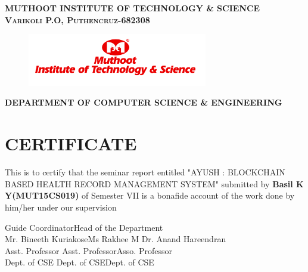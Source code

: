 \documentclass[12pt]{report}
\begin{document}
\newpage\begin{titlepage}
\center


\textsc{ \textbf{MUTHOOT INSTITUTE OF TECHNOLOGY \& SCIENCE}}\\
\textsc{\textbf{Varikoli P.O, Puthencruz-682308}}
\vspace{0.7cm}
\begin{figure}[H]
\centering
\includegraphics[width=0.7\textwidth]{logo.png}\\
\end{figure}
\vspace{0.2cm}
\textsc{ \small \textbf{ DEPARTMENT OF COMPUTER SCIENCE \& ENGINEERING}}\\
\section*{\centering CERTIFICATE}
\begin{center}
 This is to certify that the seminar report entitled "AYUSH : BLOCKCHAIN BASED HEALTH RECORD MANAGEMENT SYSTEM" submitted by \textbf{Basil K Y(MUT15CS019)} of Semester VII is  a bonafide account of the work done by him/her under our supervision\\
\end{center}
\vspace{1.6cm}




\noindent Guide \hspace{3.6cm} Coordinator\hfill Head of the Department
\\
\noindent Mr. Bineeth Kuriakose\hspace{0.82cm}Ms Rakhee M \hfill Dr. Anand Hareendran\\
\noindent Asst. Professor\hspace{2.10cm} Asst. Professor\hfill Asso. Professor\\
\noindent Dept. of CSE\hspace{2.39cm} Dept. of CSE\hfill Dept. of CSE




\end{titlepage}
\newpage
{}
\end{document}
